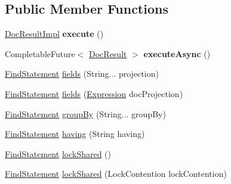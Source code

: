 \subsection*{Public Member Functions}
\begin{DoxyCompactItemize}
\item 
\mbox{\label{classcom_1_1mysql_1_1cj_1_1xdevapi_1_1_find_statement_impl_aa812b042acda3c78caf484a0604faae0}} 
\mbox{\hyperlink{classcom_1_1mysql_1_1cj_1_1xdevapi_1_1_doc_result_impl}{Doc\+Result\+Impl}} {\bfseries execute} ()
\item 
\mbox{\label{classcom_1_1mysql_1_1cj_1_1xdevapi_1_1_find_statement_impl_a851e48c8b47c5c2c34d351fba83ccf85}} 
Completable\+Future$<$ \mbox{\hyperlink{interfacecom_1_1mysql_1_1cj_1_1xdevapi_1_1_doc_result}{Doc\+Result}} $>$ {\bfseries execute\+Async} ()
\item 
\mbox{\hyperlink{interfacecom_1_1mysql_1_1cj_1_1xdevapi_1_1_find_statement}{Find\+Statement}} \mbox{\hyperlink{classcom_1_1mysql_1_1cj_1_1xdevapi_1_1_find_statement_impl_a0949083d6d4ba7dff81c2ead999373bf}{fields}} (String... projection)
\item 
\mbox{\hyperlink{interfacecom_1_1mysql_1_1cj_1_1xdevapi_1_1_find_statement}{Find\+Statement}} \mbox{\hyperlink{classcom_1_1mysql_1_1cj_1_1xdevapi_1_1_find_statement_impl_a52d3c488bb46564fdab7629781d6c99b}{fields}} (\mbox{\hyperlink{classcom_1_1mysql_1_1cj_1_1xdevapi_1_1_expression}{Expression}} doc\+Projection)
\item 
\mbox{\hyperlink{interfacecom_1_1mysql_1_1cj_1_1xdevapi_1_1_find_statement}{Find\+Statement}} \mbox{\hyperlink{classcom_1_1mysql_1_1cj_1_1xdevapi_1_1_find_statement_impl_ad75d9465a8dec5c2340ab8b25678f97d}{group\+By}} (String... group\+By)
\item 
\mbox{\hyperlink{interfacecom_1_1mysql_1_1cj_1_1xdevapi_1_1_find_statement}{Find\+Statement}} \mbox{\hyperlink{classcom_1_1mysql_1_1cj_1_1xdevapi_1_1_find_statement_impl_aa5772a01729fde08c5959498e56b5448}{having}} (String having)
\item 
\mbox{\hyperlink{interfacecom_1_1mysql_1_1cj_1_1xdevapi_1_1_find_statement}{Find\+Statement}} \mbox{\hyperlink{classcom_1_1mysql_1_1cj_1_1xdevapi_1_1_find_statement_impl_acdc867ddce32e3776d059f72a601fbdd}{lock\+Shared}} ()
\item 
\mbox{\hyperlink{interfacecom_1_1mysql_1_1cj_1_1xdevapi_1_1_find_statement}{Find\+Statement}} \mbox{\hyperlink{classcom_1_1mysql_1_1cj_1_1xdevapi_1_1_find_statement_impl_aecf5ef40361b9b8646b416543c82d2d4}{lock\+Shared}} (Lock\+Contention lock\+Contention)

\end{DoxyCompactItemize}
